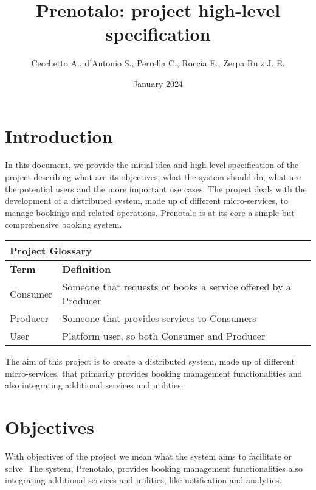 \documentclass{article}
\title{Prenotalo: project high-level specification}
\author{Cecchetto A., d'Antonio S., Perrella C., Roccia E., Zerpa Ruiz J. E.}
\date{January 2024}
\begin{document}
\maketitle

\section{Introduction}
In this document, we provide the initial idea and high-level specification of the project describing what are its objectives, what the system should do, what are the potential users and the more important use cases. The project deals with the development of a distributed system, made up of different micro-services, to manage bookings and related operations. Prenotalo is at its core a simple but comprehensive booking system.
\begin{table}[!h]
\centering
\begin{tabular}{l l}
\multicolumn{2}{l}{\textbf{Project Glossary}} \\
\hline
\textbf{Term} & \textbf{Definition} \\
\hline
Consumer & Someone that requests or books a service offered by a Producer \\
\hline
Producer & Someone that provides services to Consumers \\
\hline
User & Platform user, so both Consumer and Producer \\
\hline
\end{tabular}

\end{table}

The aim of this project is to create a distributed system, made up of different
micro-services, that primarily provides booking management functionalities
and also integrating additional services and utilities.

\section{Objectives}
With objectives of the project we mean what the system aims to facilitate or
solve. The system, Prenotalo, provides booking management functionalities also
integrating additional services and utilities, like notification and analytics.
\end{document}
